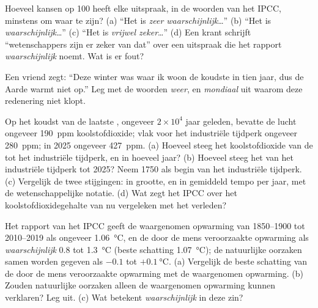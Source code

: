 \begin{exercise}[$\star\star$]\label{exo:g9:climate-past-and-present:9}
Hoeveel kansen op 100 heeft elke uitspraak, in de woorden van het IPCC,
minstens om waar te zijn? (a) ``Het is \emph{zeer waarschijnlijk}\ldots''
(b) ``Het is \emph{waarschijnlijk}\ldots'' (c) ``Het is \emph{vrijwel
zeker}\ldots'' (d) Een krant schrijft ``wetenschappers zijn er zeker van
dat'' over een uitspraak die het rapport \emph{waarschijnlijk} noemt. Wat
is er fout?
\end{exercise}

\begin{exercise}[$\star\star$]\label{exo:g9:climate-past-and-present:10}
Een vriend zegt: ``Deze winter was waar ik woon de koudste in tien jaar,
dus de Aarde warmt niet op.'' Leg met de woorden \emph{weer},
\emph{} en \emph{mondiaal} uit waarom deze redenering niet klopt.
\end{exercise}

\begin{exercise}[$\star\star\star$]\label{exo:g9:climate-past-and-present:11}
Op het koudst van de laatste , ongeveer $2 \times 10^4$ jaar
geleden, bevatte de lucht ongeveer \qty{190}{ppm} koolstofdioxide; vlak
voor het industriële tijdperk ongeveer \qty{280}{ppm}; in 2025 ongeveer
\qty{427}{ppm}. (a) Hoeveel steeg het koolstofdioxide van de  tot
het industriële tijdperk, en in hoeveel jaar? (b) Hoeveel steeg het van
het industriële tijdperk tot 2025? Neem 1750 als begin van het
industriële tijdperk. (c) Vergelijk de twee stijgingen: in grootte, en in
gemiddeld tempo per jaar, met de wetenschappelijke notatie. (d) Wat zegt
het IPCC over het koolstofdioxidegehalte van nu vergeleken met het
verleden?
\end{exercise}

\begin{exercise}[$\star\star\star$]\label{exo:g9:climate-past-and-present:12}
Het rapport van het IPCC geeft de waargenomen opwarming van 1850--1900 tot
2010--2019 als ongeveer \qty{1.06}{\degreeCelsius}, en de door de mens
veroorzaakte opwarming als \emph{waarschijnlijk} 0.8 tot
\qty{1.3}{\degreeCelsius} (beste schatting \qty{1.07}{\degreeCelsius});
de natuurlijke oorzaken samen worden gegeven als
$-0.1$ tot $+\qty{0.1}{\degreeCelsius}$. (a) Vergelijk de beste schatting
van de door de mens veroorzaakte opwarming met de waargenomen opwarming.
(b) Zouden natuurlijke oorzaken alleen de waargenomen opwarming kunnen
verklaren? Leg uit. (c) Wat betekent \emph{waarschijnlijk} in deze zin?
\end{exercise}


